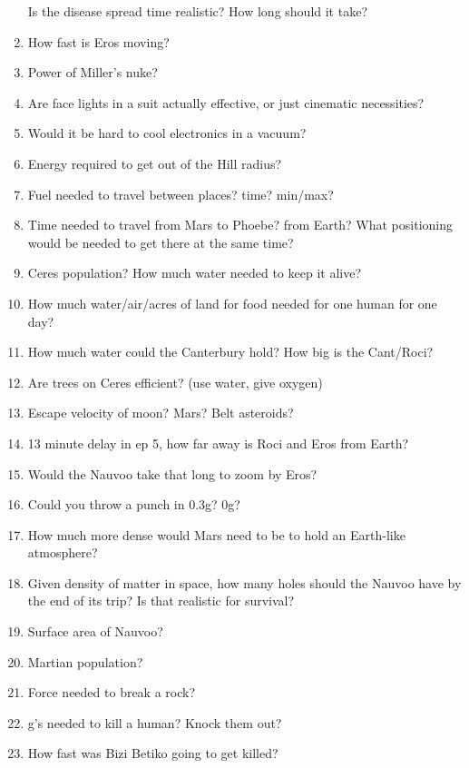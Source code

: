 \documentclass{amsart}
\theoremstyle{definition}
\begin{document}
\begin{enumerate}
    \subitem Is the disease spread time realistic? How long should it take?
    \item How fast is Eros moving?
    \item Power of Miller's nuke?
    \item Are face lights in a suit actually effective, or just cinematic necessities?
    \item Would it be hard to cool electronics in a vacuum?
    \item Energy required to get out of the Hill radius?
    \item Fuel needed to travel between places? time? min/max?
    \item Time needed to travel from Mars to Phoebe? from Earth? What positioning would be needed to get there at the same time?
    \item Ceres population? How much water needed to keep it alive?
    \item How much water/air/acres of land for food needed for one human for one day?
    \item How much water could the Canterbury hold? How big is the Cant/Roci?
    \item Are trees on Ceres efficient? (use water, give oxygen)
    \item Escape velocity of moon? Mars? Belt asteroids?
    \item 13 minute delay in ep 5, how far away is Roci and Eros from Earth?
    \item Would the Nauvoo take that long to zoom by Eros?
    \item Could you throw a punch in 0.3g? 0g?
    \item How much more dense would Mars need to be to hold an Earth-like atmosphere?
    \item Given density of matter in space, how many holes should the Nauvoo have by the end of its trip? Is that realistic for survival?
    \item Surface area of Nauvoo?
    \item Martian population?
    \item Force needed to break a rock?
    \item g's needed to kill a human? Knock them out?
    \item How fast was Bizi Betiko going to get killed?
    

\end{enumerate}
\end{document}
